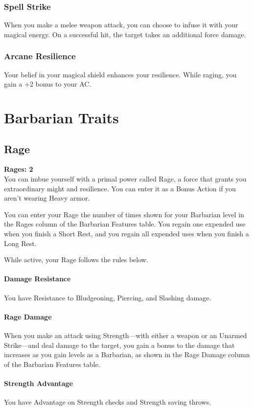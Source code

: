 \documentclass[letterpaper,openany,oneside,twocolumn]{book}
\begin{document}
\subsubsection*{Spell Strike}
When you make a melee weapon attack, you can choose to infuse it with your magical energy. On a successful hit, the target takes an additional  force damage.
\subsubsection*{Arcane Resilience}
Your belief in your magical shield enhances your resilience. While raging, you gain a +2 bonus to your AC.

\section*{Barbarian Traits}
\subsection*{Rage}
\newcommand{\RageModifier}{2}\textbf{Rages: 2}\\
You can imbue yourself with a primal power called Rage, a force that grants you extraordinary might and resilience. You can enter it as a Bonus Action if you aren't wearing Heavy armor.

You can enter your Rage the number of times shown for your Barbarian level in the Rages column of the Barbarian Features table. You regain one expended use when you finish a Short Rest, and you regain all expended uses when you finish a Long Rest.

While active, your Rage follows the rules below.

\paragraph*{Damage Resistance} You have Resistance to Bludgeoning, Piercing, and Slashing damage.

\paragraph*{Rage Damage} When you make an attack using Strength—with either a weapon or an Unarmed Strike—and deal damage to the target, you gain a bonus to the damage that increases as you gain levels as a Barbarian, as shown in the Rage Damage column of the Barbarian Features table.

\paragraph*{Strength Advantage} You have Advantage on Strength checks and Strength saving throws.
\end{document}
